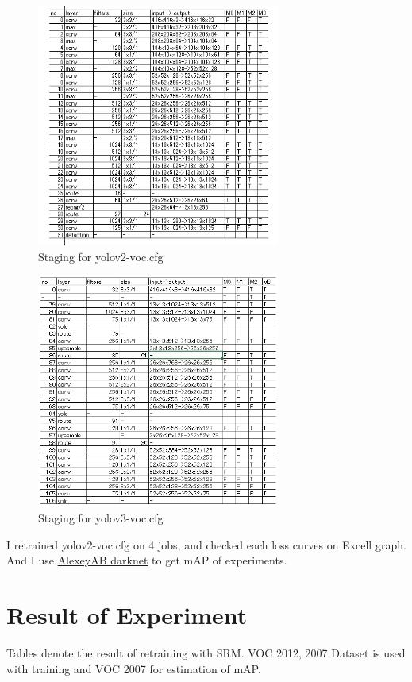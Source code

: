 \documentclass[10pt,a4paper,twocolumn]{article}
\begin{document}
\begin{figure}
\includegraphics[width=8cm]{yolov2-voc_Stages.png}
\caption{Staging for yolov2-voc.cfg}
\end{figure}

\begin{figure}
\includegraphics[width=8cm]{yolov3-voc_Stages.png}
\caption{Staging for yolov3-voc.cfg}
\end{figure}

I retrained yolov2-voc.cfg on 4 jobs, and checked each loss curves on Excell graph.
And I use \href{https://github.com/AlexeyAB/darknet}{AlexeyAB darknet} to get mAP of experiments.

\section{Result of Experiment}

Tables denote the result of retraining with SRM.
VOC 2012, 2007 Dataset is used with training and VOC 2007 for estimation of mAP.
\end{document}
